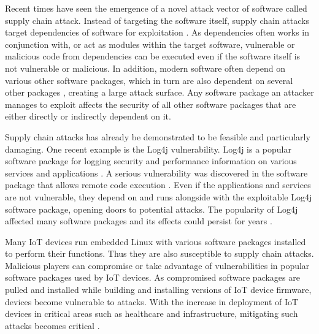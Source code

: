 
Recent times have seen the emergence of a novel attack vector of software
called supply chain attack. Instead of targeting the software itself, supply
chain attacks target dependencies of software for exploitation
\cite{Review_of_Open_Source, Evaluating_and_Mitigating}. As dependencies often
works in conjunction with, or act as modules within the target software,
vulnerable or malicious code from dependencies can be executed even if the
software itself is not vulnerable or malicious. In addition, modern software
often depend on various other software packages, which in turn are also
dependent on several other packages \cite{Evaluating_and_mitigating}, creating
a large attack surface. Any software package an attacker manages to exploit
affects the security of all other software packages that are either directly or
indirectly dependent on it.\par

Supply chain attacks has already be demonstrated to be feasible and
particularly damaging. One recent example is the Log4j vulnerability. Log4j is
a popular software package for logging security and performance information on
various services and applications \cite{CISA}. A serious vulnerability was
discovered in the software package that allows remote code execution
\cite{CISA}. Even if the applications and services are not vulnerable, they
depend on and runs alongside with the exploitable Log4j software package,
opening doors to potential attacks. The popularity of Log4j affected many
software packages \cite{CISA_Log4j_List} and its effects could persist for
years \cite{Review_of_log4j}.\par

Many IoT devices run embedded Linux with various software packages installed to
perform their functions. Thus they are also susceptible to supply chain
attacks. Malicious players can compromise or take advantage of vulnerabilities
in popular software packages used by IoT devices. As compromised software
packages are pulled and installed while building and installing versions of IoT
device firmware, devices become vulnerable to attacks. With the increase in
deployment of IoT devices in critical areas such as healthcare and
infrastructure, mitigating such attacks becomes critical
\cite{IoT_Supply_Chain_Attack_Trends}.\par 

